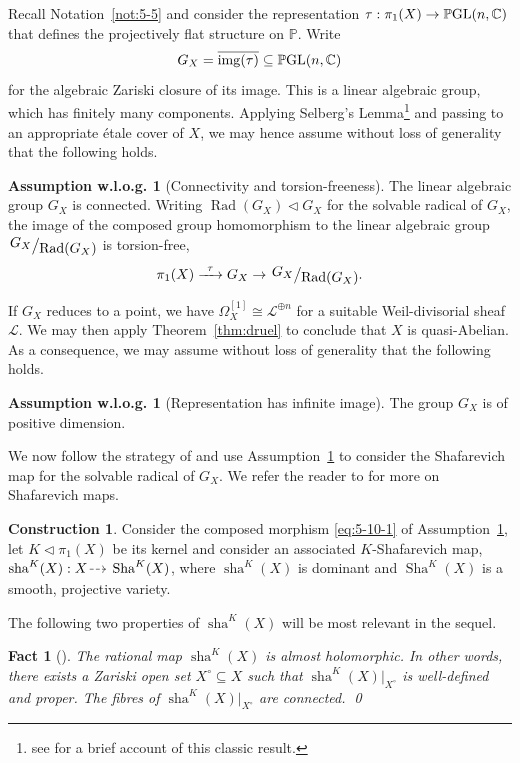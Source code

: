 \documentclass[JEP,XML,SOM,Unicode,published]{cedram}
\let\scr\mathscr
\newcommand{\To}[1]{\mathchoice{\xrightarrow{\ts\kern4pt#1\kern3pt}}{\stackrel{#1}{\longrightarrow}}{}{}}
\let\ts\relax
\newcommand{\dradpl}{{\hspace*{-2.5mm}\begin{tikzcd}[ampersand replacement=\&,column sep = scriptsize]\mbox{}\ar[r,dashed]\&\mbox{}\end{tikzcd}\hspace*{-2.5mm}}}
\newcommand{\dratst}{{\hspace*{-2.5mm}\begin{tikzcd}[ampersand replacement=\&,column sep = small]\mbox{}\ar[r,dashed]\&\mbox{}\end{tikzcd}\hspace*{-2mm}}}
\let\drascst\dratst
\newcommand{\dra}{\mathchoice{\dradpl}{\dratst}{\drascst}{\drascst}}
\let\dasharrow\dra
\theoremstyle{plain}
\newtheorem{fact}[thm]{Fact}
\theoremstyle{definition}
\newtheorem{asswlog}[thm]{Assumption w.l.o.g.}
\newtheorem{construction}[thm]{Construction}
\numberwithin{equation}{thm}
\numberwithin{enumi}{thm}
\DeclareMathOperator{\img}{img}
\DeclareMathOperator{\GL}{GL}
\DeclareMathOperator{\PGL}{\bP\negthinspace\GL}
\DeclareMathOperator{\Rad}{Rad}
\DeclareMathOperator{\sh}{sha}
\DeclareMathOperator{\Sh}{Sha}
\newcommand{\sL}{\scr{L}}
\newcommand{\bC}{\mathbb{C}}
\newcommand{\bP}{\mathbb{P}}
\newcommand{\factor}[2]{\left. \raise 2pt\hbox{$#1$} \right/\hskip -2pt\raise -2pt\hbox{$#2$}}
\begin{document}
Recall Notation~\ref{not:5-5} and consider the representation
$\tau: \pi_1(X) \to \PGL(n,\bC)$ that defines the projectively flat structure on $\bP$.
Write
\[
G_X = \overline{\img(\tau)} \subseteq \PGL(n,\bC)
\]
for the algebraic Zariski closure
of its image. This is a linear algebraic group, which has finitely many
components. Applying Selberg's Lemma\footnote{see \cite{MR925989} for a brief
account of this classic result.} and passing to an appropriate étale cover of
$X$, we may hence assume without loss of generality that the following holds.

\begin{asswlog}[Connectivity and torsion-freeness]\label{asswlog:conn}
The linear algebraic group $G_X$ is connected. Writing $\Rad(G_X) \lhd G_X$
for the solvable radical of $G_X$, the image of the composed group
homomorphism to the linear algebraic group $\factor{G_X}{\Rad(G_X)}$ is
torsion-free,
\begin{equation}\label{eq:5-10-1}
\pi_1(X) \To{\tau} G_X \to \factor{G_X}{\Rad(G_X)}.
\end{equation}
\end{asswlog}
If $G_X$ reduces to a point, we have $\Omega^{[1]}_X \cong \sL^{\oplus n}$ for a suitable
Weil-divisorial sheaf~$\sL$. We may then apply Theorem~\ref{thm:druel} to
conclude that $X$ is quasi-Abelian. As a consequence, we may assume without
loss of generality that the following holds.

\begin{asswlog}[Representation has infinite image]\label{claim:5-x}
The group $G_X$ is of positive dimension.
\end{asswlog}

We now follow the strategy of \cite{MR3030068} and use
Assumption~\ref{claim:5-x} to consider the Shafarevich map for the solvable
radical of $G_X$. We refer the reader to \cite[\S 3]{MR1341589} for more on
Shafarevich maps.

\begin{construction}
Consider the composed morphism \eqref{eq:5-10-1} of
Assumption~\ref{asswlog:conn}, let $K \lhd \pi_1(X)$ be its kernel and consider
an associated $K$-Shafarevich map, $\sh^K(X): X \dasharrow \Sh^K(X)$, where
$\sh^K(X)$ is dominant and $\Sh^K(X)$ is a smooth, projective variety.
\end{construction}

The following two properties of $\sh^K(X)$ will be most relevant in the sequel.

\begin{fact}[]
The rational map $\sh^K(X)$ is almost holomorphic. In other words, there
exists a Zariski open set $X^\circ \subseteq X$ such that $\sh^K(X)|_{X^\circ}$ is well-defined
and proper. The fibres of $\sh^K(X)|_{X^\circ}$ are connected. \qed
\end{fact}
\end{document}
